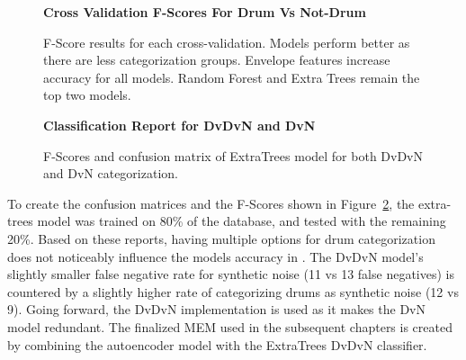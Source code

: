 \documentclass[\main/thesis.tex]{subfiles}
\begin{document}
\begin{figure}[tbp]   
    \begin{center}
        \textbf{Cross Validation F-Scores For Drum Vs Not-Drum}
    \caption{F-Score results for each cross-validation. Models perform better as there are less categorization groups. Envelope features increase accuracy for all models. Random Forest and Extra Trees remain the top two models. }
    \label{fig:f1_dvn_box}
    \end{center}
\end{figure}


\begin{figure}[tbp]
\begin{center}
    \textbf{ Classification Report for DvDvN and DvN  }\par\medskip
\label{fig:conf_f1_dvd}
\end{center}

\begin{center}
\end{center}


\caption{F-Scores and confusion matrix of ExtraTrees model for both DvDvN and DvN categorization.}
\label{fig:conf_f1_dvn}
\end{figure}

To create the confusion matrices and the F-Scores shown in Figure~\ref{fig:conf_f1_dvn}, the extra-trees model was trained on 80\% of the database, and tested with the remaining 20\%. Based on these reports, having multiple options for drum categorization does not noticeably influence the models accuracy in \decfirst. The DvDvN model's slightly smaller false negative rate for synthetic noise (11 vs 13 false negatives) is countered by a slightly higher rate of categorizing drums as synthetic noise (12 vs 9). Going forward, the DvDvN implementation is used as it makes the DvN model redundant. The finalized MEM used in the subsequent chapters is created by combining the autoencoder model with the ExtraTrees DvDvN classifier. 
\end{document}
